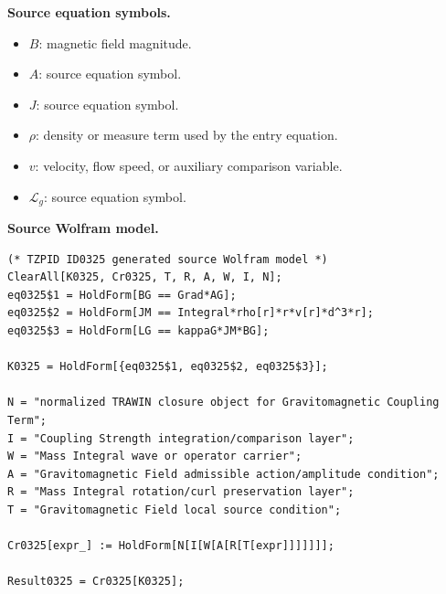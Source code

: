 \begin{minipage}[t]{0.49\linewidth}
\begingroup
\small
\raggedright
\textbf{Source equation symbols.}\par
\begin{itemize}[leftmargin=1.35em,itemsep=1pt,topsep=1pt,parsep=0pt]
    \item $B$: magnetic field magnitude.
    \item $A$: source equation symbol.
    \item $J$: source equation symbol.
    \item $\rho$: density or measure term used by the entry equation.
    \item $v$: velocity, flow speed, or auxiliary comparison variable.
    \item $\mathcal{L}_{g}$: source equation symbol.
\end{itemize}
\endgroup
\end{minipage}\hfill
\begin{minipage}[t]{0.47\linewidth}
\begingroup
\scriptsize
\raggedright
\textbf{Source Wolfram model.}\par
\begin{Verbatim}[fontsize=\tiny,breaklines=true,breakanywhere=true]
(* TZPID ID0325 generated source Wolfram model *)
ClearAll[K0325, Cr0325, T, R, A, W, I, N];
eq0325$1 = HoldForm[BG == Grad*AG];
eq0325$2 = HoldForm[JM == Integral*rho[r]*r*v[r]*d^3*r];
eq0325$3 = HoldForm[LG == kappaG*JM*BG];

K0325 = HoldForm[{eq0325$1, eq0325$2, eq0325$3}];

N = "normalized TRAWIN closure object for Gravitomagnetic Coupling Term";
I = "Coupling Strength integration/comparison layer";
W = "Mass Integral wave or operator carrier";
A = "Gravitomagnetic Field admissible action/amplitude condition";
R = "Mass Integral rotation/curl preservation layer";
T = "Gravitomagnetic Field local source condition";

Cr0325[expr_] := HoldForm[N[I[W[A[R[T[expr]]]]]]];

Result0325 = Cr0325[K0325];
\end{Verbatim}
\endgroup
\end{minipage}

